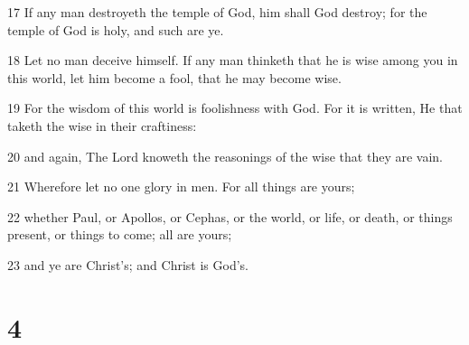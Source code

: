 \par 17 If any man destroyeth the temple of God, him shall God destroy; for the temple of God is holy, and such are ye.
\par 18 Let no man deceive himself. If any man thinketh that he is wise among you in this world, let him become a fool, that he may become wise.
\par 19 For the wisdom of this world is foolishness with God. For it is written, He that taketh the wise in their craftiness:
\par 20 and again, The Lord knoweth the reasonings of the wise that they are vain.
\par 21 Wherefore let no one glory in men. For all things are yours;
\par 22 whether Paul, or Apollos, or Cephas, or the world, or life, or death, or things present, or things to come; all are yours;
\par 23 and ye are Christ's; and Christ is God's.

\chapter{4}


